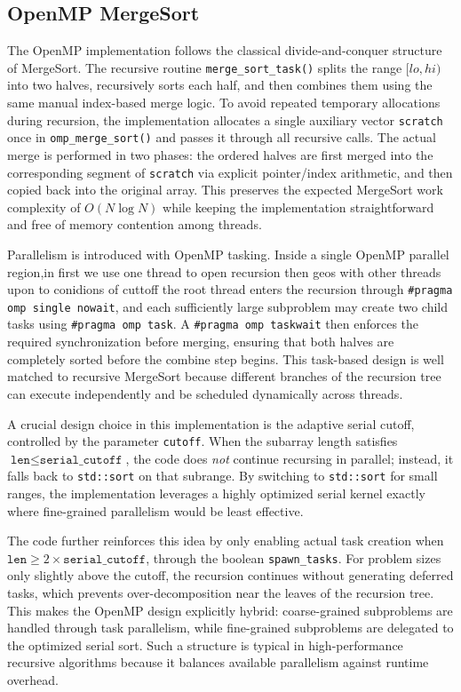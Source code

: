 \documentclass[12pt, a4paper]{article}
\begin{document}
\subsection{OpenMP MergeSort}
The OpenMP implementation follows the classical divide-and-conquer structure of MergeSort. The recursive routine \texttt{merge\_sort\_task()} splits the range $[lo, hi)$ into two halves, recursively sorts each half, and then combines them using the same manual index-based merge logic. To avoid repeated temporary allocations during recursion, the implementation allocates a single auxiliary vector \texttt{scratch} once in \texttt{omp\_merge\_sort()} and passes it through all recursive calls. The actual merge is performed in two phases: the ordered halves are first merged into the corresponding segment of \texttt{scratch} via explicit pointer/index arithmetic, and then copied back into the original array. This preserves the expected MergeSort work complexity of $O(N \log N)$ while keeping the implementation straightforward and free of memory contention among threads.

Parallelism is introduced with OpenMP tasking. Inside a single OpenMP parallel region,in first we use  one thread to open recursion then geos with other threads upon to conidions of cuttoff the root thread enters the recursion through \texttt{\#pragma omp single nowait}, and each sufficiently large subproblem may create two child tasks using \texttt{\#pragma omp task}. A \texttt{\#pragma omp taskwait} then enforces the required synchronization before merging, ensuring that both halves are completely sorted before the combine step begins. This task-based design is well matched to recursive MergeSort because different branches of the recursion tree can execute independently and be scheduled dynamically across threads.

A crucial design choice in this implementation is the adaptive serial cutoff, controlled by the parameter \texttt{cutoff}. When the subarray length satisfies $\texttt{len} \le \texttt{serial\_cutoff}$, the code does \emph{not} continue recursing in parallel; instead, it falls back to \texttt{std::sort} on that subrange. By switching to \texttt{std::sort} for small ranges, the implementation leverages a highly optimized serial kernel exactly where fine-grained parallelism would be least effective.

The code further reinforces this idea by only enabling actual task creation when $\texttt{len} \ge 2 \times \texttt{serial\_cutoff}$, through the boolean \texttt{spawn\_tasks}. For problem sizes only slightly above the cutoff, the recursion continues without generating deferred tasks, which prevents over-decomposition near the leaves of the recursion tree. This makes the OpenMP design explicitly hybrid: coarse-grained subproblems are handled through task parallelism, while fine-grained subproblems are delegated to the optimized serial sort. Such a structure is typical in high-performance recursive algorithms because it balances available parallelism against runtime overhead.
\end{document}

